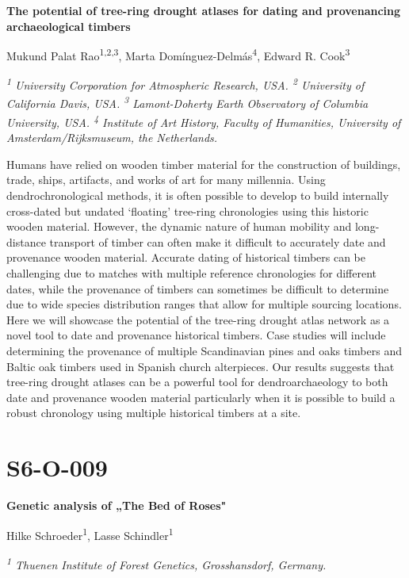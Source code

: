 \documentclass[
]{book}
\begin{document}
\textbf{The potential of tree-ring drought atlases for dating and provenancing archaeological timbers}

Mukund Palat Rao\textsuperscript{1,2,3}, Marta Domínguez-Delmás\textsuperscript{4}, Edward R. Cook\textsuperscript{3}

\emph{\textsuperscript{1} University Corporation for Atmospheric Research, USA. \textsuperscript{2} University of California Davis, USA. \textsuperscript{3} Lamont-Doherty Earth Observatory of Columbia University, USA. \textsuperscript{4} Institute of Art History, Faculty of Humanities, University of Amsterdam/Rijksmuseum, the Netherlands.}

Humans have relied on wooden timber material for the construction of buildings, trade, ships, artifacts, and works of art for many millennia. Using dendrochronological methods, it is often possible to develop to build internally cross-dated but undated `floating' tree-ring chronologies using this historic wooden material. However, the dynamic nature of human mobility and long-distance transport of timber can often make it difficult to accurately date and provenance wooden material. Accurate dating of historical timbers can be challenging due to matches with multiple reference chronologies for different dates, while the provenance of timbers can sometimes be difficult to determine due to wide species distribution ranges that allow for multiple sourcing locations. Here we will showcase the potential of the tree-ring drought atlas network as a novel tool to date and provenance historical timbers. Case studies will include determining the provenance of multiple Scandinavian pines and oaks timbers and Baltic oak timbers used in Spanish church alterpieces. Our results suggests that tree-ring drought atlases can be a powerful tool for dendroarchaeology to both date and provenance wooden material particularly when it is possible to build a robust chronology using multiple historical timbers at a site.

\hypertarget{s6-o-009}{%
\section*{S6-O-009}\label{s6-o-009}}

\textbf{Genetic analysis of „The Bed of Roses"}

Hilke Schroeder\textsuperscript{1}, Lasse Schindler\textsuperscript{1}

\emph{\textsuperscript{1} Thuenen Institute of Forest Genetics, Grosshansdorf, Germany.}
\end{document}

